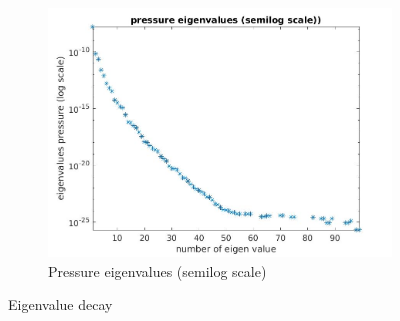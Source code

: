 \documentclass[graybox]{svmult}
\begin{document}
\begin{figure}[H]
\begin{subfigure}{0.31\textwidth}
\includegraphics[width=\linewidth]{pressure_eigen_value_semilog.jpg}
\caption{Pressure eigenvalues (semilog scale)} \label{pressure_ev}
\end{subfigure}
\caption{Eigenvalue decay}\label{ev_decay}
\end{figure}

%
%
%
%



%
\end{document}
